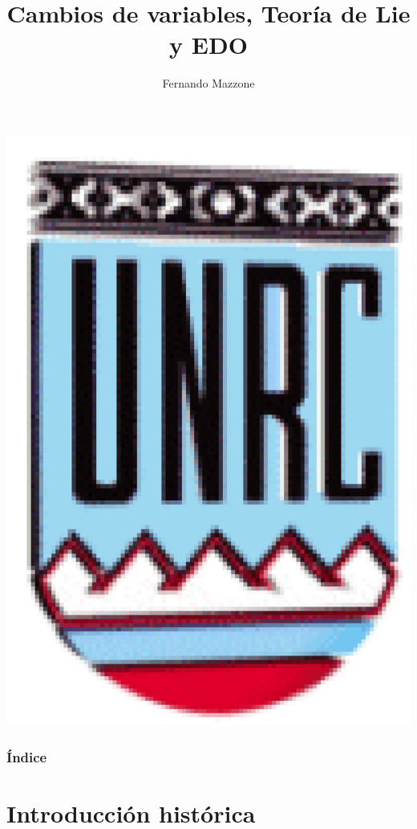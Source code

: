 \documentclass[handout,hyperref={colorlinks=true}]{beamer}
\title[Teoría de Lie y ODE] %
{%
Cambios de variables, Teoría de Lie y EDO
}
\author[] %
{Fernando Mazzone}
\institute[Depto de Matemática] %
{
 Depto de Matemática\\
Facultad de Ciencias Exactas Físico-Químicas y Naturales\\
Universidad Nacional de Río Cuarto}
\begin{document}
\begin{frame}
  \maketitle
  \begin{center}
   \includegraphics[scale=0.2]{imagenes/unrc.jpg}
   \end{center}
\end{frame}
\begin{frame}
    \frametitle{Índice}
\tableofcontents

\end{frame}

\section[Historia]{Introducción histórica}
\end{document}
